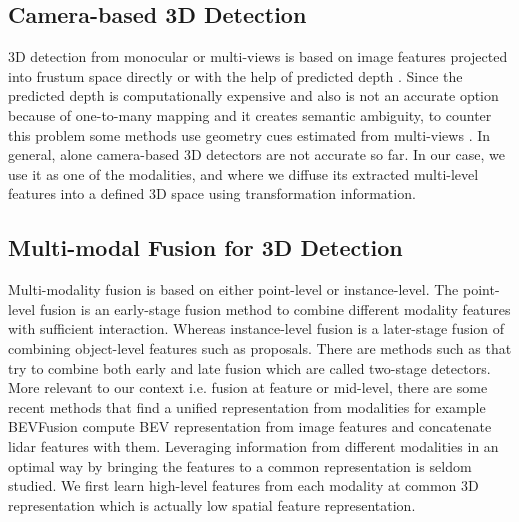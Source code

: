 \documentclass[10pt,twocolumn,letterpaper]{article}
\begin{document}
\subsection{Camera-based 3D Detection}
3D detection from monocular or multi-views is based on image features projected into frustum space directly or with the help of predicted depth \cite{brazil2019m3d, simonelli2019disentangling, wang2021fcos3d, huang2021bevdet, chen2020dsgn }. Since the predicted depth is computationally expensive and also is not an accurate option because of one-to-many mapping and it creates semantic ambiguity, to counter this problem some methods use geometry cues estimated from multi-views \cite{wang2022detr3d, liu2022petr}. In general, alone camera-based 3D detectors are not accurate so far. In our case, we use it as one of the modalities, and where we diffuse its extracted multi-level features into a defined 3D space using transformation information. 

\subsection{Multi-modal Fusion for 3D Detection}
Multi-modality fusion is based on either point-level or instance-level. The point-level fusion \cite{liang2018deep,huang2020epnet,yin2021multimodal,li2022voxel} is an early-stage fusion method to combine different modality features with sufficient interaction. Whereas instance-level fusion \cite{chen2017multi,ku2018joint,yoo20203d} is a later-stage fusion of combining object-level features such as proposals. There are methods such as \cite{sindagi2019mvx} that try to combine both early and late fusion which are called two-stage detectors. 
More relevant to our context i.e. fusion at feature or mid-level, there are some recent methods that find a unified representation from modalities for example BEVFusion \cite{yoo20203d, liu2022bevfusion,liang2022bevfusion} 
compute BEV representation from image features and concatenate lidar features with them. Leveraging information from different modalities in an optimal way by bringing the features to a common representation is seldom studied. We first learn high-level features from each modality at common 3D representation which is actually low spatial feature representation.   
\end{document}
